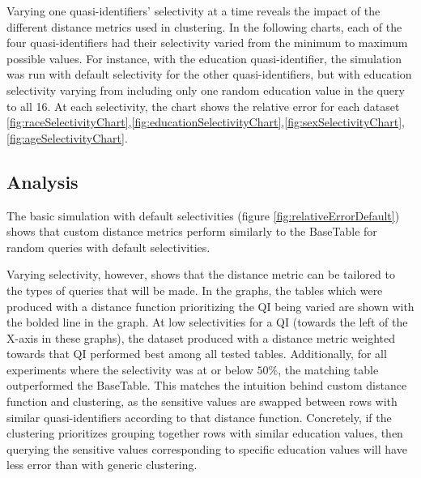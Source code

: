 Varying one quasi-identifiers' selectivity at a time reveals the impact of the different distance metrics used in clustering. In the following charts, each of the four quasi-identifiers had their selectivity varied from the minimum to maximum possible values. For instance, with the education quasi-identifier, the simulation was run with default selectivity for the other quasi-identifiers, but with education selectivity varying from including only one random education value in the query to all 16. At each selectivity, the chart shows the relative error for each dataset \ref{fig:raceSelectivityChart},\ref{fig:educationSelectivityChart},\ref{fig:sexSelectivityChart},\ref{fig:ageSelectivityChart}.

\begin{figure*}
  \centering
  
  \caption{RaceTable Relative Error by Selectivity}
  \label{fig:raceSelectivityChart}
\end{figure*}
\begin{figure*}
  \centering
  
  \caption{EducationTable Relative Error by Selectivity}
  \label{fig:educationSelectivityChart}
\end{figure*}
\begin{figure*}
  \centering
  
  \caption{SexTable Relative Error by Selectivity}
  \label{fig:sexSelectivityChart}
\end{figure*}
\begin{figure*}
  \centering
  
  \caption{AgeTable Relative Error by Selectivity}
  \label{fig:ageSelectivityChart}
\end{figure*}

\subsection{Analysis}

The basic simulation with default selectivities (figure \ref{fig:relativeErrorDefault}) shows that custom distance metrics perform similarly to the BaseTable for random queries with default selectivities.

Varying selectivity, however, shows that the distance metric can be tailored to the types of queries that will be made. In the graphs, the tables which were produced with a distance function prioritizing the QI being varied are shown with the bolded line in the graph. At low selectivities for a QI (towards the left of the X-axis in these graphs), the dataset produced with a distance metric weighted towards that QI performed best among all tested tables. Additionally, for all experiments where the selectivity was at or below $50\%$, the matching table outperformed the BaseTable. This matches the intuition behind custom distance function and clustering, as the sensitive values are swapped between rows with similar quasi-identifiers according to that distance function. Concretely, if the clustering prioritizes grouping together rows with similar education values, then querying the sensitive values corresponding to specific education values will have less error than with generic clustering.

